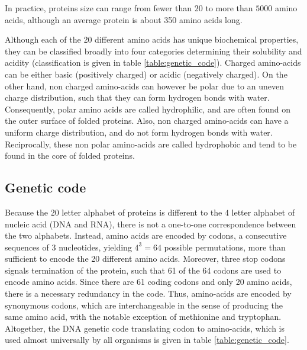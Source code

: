 In practice, proteins size can range from fewer than $20$ to more than $5000$ amino acids, although an average protein is about 350 amino acids long.

Although each of the 20 different amino acids has unique biochemical properties, they can be classified broadly into four categories determining their solubility and acidity (classification is given in table \ref{table:genetic_code}).
Charged amino-acids can be either basic (positively charged) or acidic (negatively charged).
On the other hand, non charged amino-acids can however be polar due to an uneven charge distribution, such that they can form hydrogen bonds with water.
Consequently, polar amino acids are called hydrophilic, and are often found on the outer surface of folded proteins.
Also, non charged amino-acids can have a uniform charge distribution, and do not form hydrogen bonds with water.
Reciprocally, these non polar amino-acids are called hydrophobic and tend to be found in the core of folded proteins.

\subsection{Genetic code}

Because the $20$ letter alphabet of proteins is different to the $4$ letter alphabet of nucleic acid (DNA and RNA), there is not a one-to-one correspondence between the two alphabets.
Instead, amino acids are encoded by codons, a consecutive sequences of 3 nucleotides, yielding $4^3=64$ possible permutations, more than sufficient to encode the 20 different amino acids.
Moreover, three stop codons signals termination of the protein, such that 61 of the 64 codons are used to encode amino acids.
Since there are 61 coding codons and only 20 amino acids, there is a necessary redundancy in the code.
Thus, amino-acids are encoded by synonymous codons, which are interchangeable in the sense of producing the same amino acid, with the notable exception of methionine and tryptophan.
Altogether, the DNA genetic code translating codon to amino-acids, which is used almost universally by all organisms is given in table \ref{table:genetic_code}.


